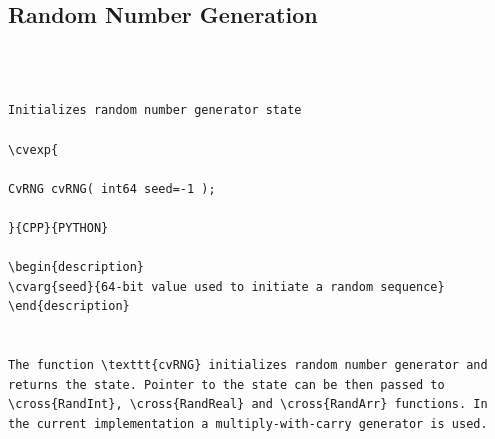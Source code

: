 \subsection{Random Number Generation}
\begin{verbatim}


\end{verbatim}
\label{RNG}
\begin{verbatim}

Initializes random number generator state

\cvexp{

CvRNG cvRNG( int64 seed=-1 );

}{CPP}{PYTHON}

\begin{description}
\cvarg{seed}{64-bit value used to initiate a random sequence}
\end{description}


The function \texttt{cvRNG} initializes random number generator and returns the state. Pointer to the state can be then passed to \cross{RandInt}, \cross{RandReal} and \cross{RandArr} functions. In the current implementation a multiply-with-carry generator is used.


\end{verbatim}
\label{RandArr}
